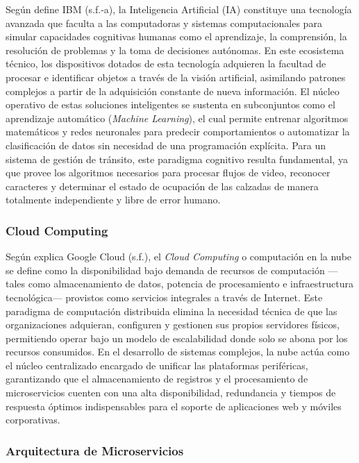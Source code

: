 \documentclass[12pt,a4paper]{article}
\begin{document}
Según define IBM (s.f.-a), la Inteligencia Artificial (IA) constituye una tecnología avanzada que faculta a las computadoras y sistemas computacionales para simular capacidades cognitivas humanas como el aprendizaje, la comprensión, la resolución de problemas y la toma de decisiones autónomas. En este ecosistema técnico, los dispositivos dotados de esta tecnología adquieren la facultad de procesar e identificar objetos a través de la visión artificial, asimilando patrones complejos a partir de la adquisición constante de nueva información. El núcleo operativo de estas soluciones inteligentes se sustenta en subconjuntos como el aprendizaje automático (\textit{Machine Learning}), el cual permite entrenar algoritmos matemáticos y redes neuronales para predecir comportamientos o automatizar la clasificación de datos sin necesidad de una programación explícita. Para un sistema de gestión de tránsito, este paradigma cognitivo resulta fundamental, ya que provee los algoritmos necesarios para procesar flujos de video, reconocer caracteres y determinar el estado de ocupación de las calzadas de manera totalmente independiente y libre de error humano.

\subsubsection{Cloud Computing}

Según explica Google Cloud (s.f.), el \textit{Cloud Computing} o computación en la nube se define como la disponibilidad bajo demanda de recursos de computación —tales como almacenamiento de datos, potencia de procesamiento e infraestructura tecnológica— provistos como servicios integrales a través de Internet. Este paradigma de computación distribuida elimina la necesidad técnica de que las organizaciones adquieran, configuren y gestionen sus propios servidores físicos, permitiendo operar bajo un modelo de escalabilidad donde solo se abona por los recursos consumidos. En el desarrollo de sistemas complejos, la nube actúa como el núcleo centralizado encargado de unificar las plataformas periféricas, garantizando que el almacenamiento de registros y el procesamiento de microservicios cuenten con una alta disponibilidad, redundancia y tiempos de respuesta óptimos indispensables para el soporte de aplicaciones web y móviles corporativas.

\subsubsection{Arquitectura de Microservicios}
\end{document}
